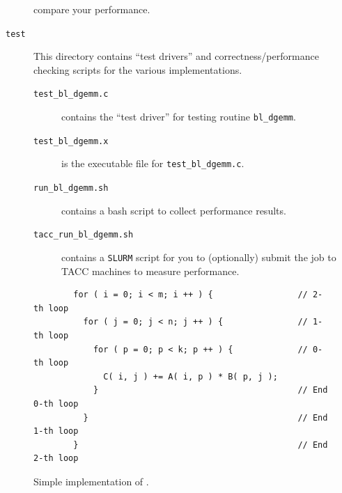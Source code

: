 \begin{description}
compare your performance.
\item[{\tt test}] This directory contains ``test drivers'' and correctness/performance checking scripts for the various implementations.
\begin{description}
\item[{\tt test\_bl\_dgemm.c}] contains the ``test driver'' for testing routine {\tt bl\_dgemm}. 
\item[{\tt test\_bl\_dgemm.x}] is the executable file for {\tt test\_bl\_dgemm.c}. 
\item[{\tt run\_bl\_dgemm.sh}] contains a bash script to collect performance results.
\item[{\tt tacc\_run\_bl\_dgemm.sh}] contains a {\tt SLURM} script for you to (optionally) submit the job to TACC machines to measure performance.
\end{description}
\end{description}

\begin{figure}[tb!]
	\begin{center}
		\begin{minipage}{4.5in}
        \begin{verbatim}
        for ( i = 0; i < m; i ++ ) {                 // 2-th loop
          for ( j = 0; j < n; j ++ ) {               // 1-th loop
            for ( p = 0; p < k; p ++ ) {             // 0-th loop
              C( i, j ) += A( i, p ) * B( p, j );
            }                                        // End 0-th loop
          }                                          // End 1-th loop
        }                                            // End 2-th loop
        \end{verbatim}
		\end{minipage}
	\end{center}
	\caption{Simple implementation of \Gemm.}
	\label{fig:threeloops}
\end{figure}

